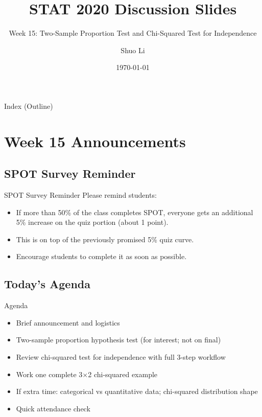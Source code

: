 \documentclass[aspectratio=169]{beamer}
\title[STAT 2020 Week 15 \hfill \insertframenumber/\inserttotalframenumber]{STAT 2020 Discussion Slides}
\subtitle{Week 15: Two-Sample Proportion Test and Chi-Squared Test for Independence}
\author{Shuo Li}
\institute{University of Iowa}
\date{\today}
\begin{document}
\begin{frame}
  \titlepage
\end{frame}

\begin{frame}[allowframebreaks]{Index (Outline)}
  \tableofcontents[hideallsubsections]
\end{frame}

\section{Week 15 Announcements}

\subsection{SPOT Survey Reminder}
\begin{frame}{SPOT Survey Reminder}
  Please remind students:
  \begin{itemize}
    \item If more than 50\% of the class completes SPOT, everyone gets an additional 5\% increase on the quiz portion (about 1 point).
    \item This is on top of the previously promised 5\% quiz curve.
    \item Encourage students to complete it as soon as possible.
  \end{itemize}
\end{frame}

\subsection{Today's Agenda}
\begin{frame}{Agenda}
  \begin{itemize}
    \item Brief announcement and logistics
    \item Two-sample proportion hypothesis test (for interest; not on final)
    \item Review chi-squared test for independence with full 3-step workflow
    \item Work one complete 3\(\times\)2 chi-squared example
    \item If extra time: categorical vs quantitative data; chi-squared distribution shape
    \item Quick attendance check
  \end{itemize}
\end{frame}
\end{document}

